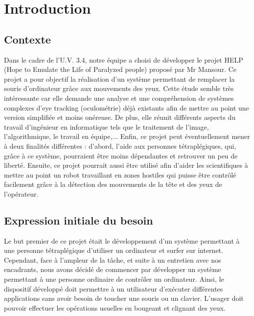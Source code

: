 \section*{Introduction}


\subsection*{Contexte}

Dans le cadre de l'U.V. 3.4, notre équipe a choisi de développer le projet HELP (Hope to Emulate the Life of Paralyzed people) proposé par Mr Mansour. Ce projet a pour objectif la réalisation d'un système permettant de remplacer la souris d’ordinateur grâce aux mouvements des yeux. Cette étude semble très intéressante car elle demande une analyse et une compréhension de systèmes complexes d'eye tracking (oculométrie) déjà existants afin de mettre au point une version simplifiée et moins onéreuse. De plus, elle réunit différents aspects du travail d'ingénieur en informatique tels que le traitement de l'image, l'algorithmique, le travail en équipe,... Enfin, ce projet peut éventuellement mener à deux finalités différentes : d'abord, l'aide aux personnes tétraplégiques, qui, grâce à ce système, pourraient être moins dépendantes et retrouver un peu de liberté. Ensuite, ce projet pourrait aussi être utilisé afin d'aider les scientifiques à mettre au point un robot travaillant en zones hostiles qui puisse être contrôlé facilement grâce à la détection des mouvements de la tête et des yeux de l'opérateur.

\subsection*{Expression initiale du besoin}

Le but premier de ce projet était le développement d'un système permettant à une personne tétraplégique d'utiliser un ordinateur et surfer sur internet. Cependant, face à l'ampleur de la tâche, et suite à un entretien avec nos encadrants, nous avons décidé de commencer par développer un système permettant à une personne ordinaire de contrôler un ordinateur. Ainsi, le dispositif développé doit permettre à un utilisateur d'exécuter différentes applications sans avoir besoin de toucher une souris ou un clavier. L'usager doit pouvoir effectuer les opérations usuelles en bougeant et clignant des yeux.
